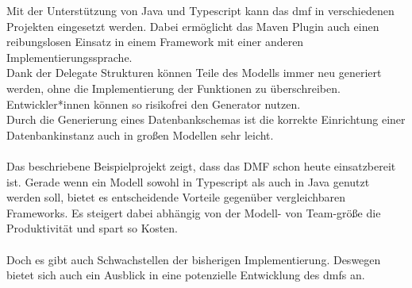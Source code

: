 \documentclass[./einleitung.tex]{subfiles}
\begin{document}
Mit der Unterstützung von Java und Typescript kann das \acrshort{dmf} in verschiedenen Projekten eingesetzt werden.
Dabei ermöglicht das Maven Plugin auch einen reibungslosen Einsatz in einem Framework mit einer anderen Implementierungssprache.\\
Dank der Delegate Strukturen können Teile des Modells immer neu generiert werden, ohne die Implementierung der Funktionen zu überschreiben.
Entwickler*innen können so risikofrei den Generator nutzen.\\
Durch die Generierung eines Datenbankschemas ist die korrekte Einrichtung einer Datenbankinstanz auch in großen Modellen sehr leicht.
\\\\
Das beschriebene Beispielprojekt zeigt, dass das DMF schon heute einsatzbereit ist.
Gerade wenn ein Modell sowohl in Typescript als auch in Java genutzt werden soll, bietet es entscheidende Vorteile gegenüber vergleichbaren Frameworks.
Es steigert dabei abhängig von der Modell- von Team-größe die Produktivität und spart so Kosten.
\\\\
Doch es gibt auch Schwachstellen der bisherigen Implementierung.
Deswegen bietet sich auch ein Ausblick in eine potenzielle Entwicklung des \acrshort{dmf}s an.
\end{document}
